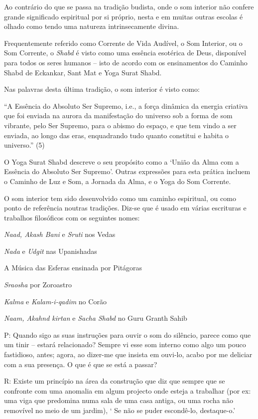 Ao contrário do que se passa na tradição budista, onde o som interior
não confere grande significado espiritual por si próprio, nesta e em
muitas outras escolas é olhado como tendo uma natureza intrinsecamente
divina.

Frequentemente referido como Corrente de Vida Audível, o Som Interior,
ou o Som Corrente, o \emph{Shabd} é visto como uma essência esotérica de
Deus, disponível para todos os seres humanos -- isto de acordo com os
ensinamentos do Caminho Shabd de Eckankar, Sant Mat e Yoga Surat Shabd.

Nas palavras desta última tradição, o som interior é visto como:

``A Essência do Absoluto Ser Supremo, i.e., a força dinâmica da energia
criativa que foi enviada na aurora da manifestação do universo sob a
forma de som vibrante, pelo Ser Supremo, para o abismo do espaço, e que
tem vindo a ser enviada, ao longo das eras, enquadrando tudo quanto
constitui e habita o universo.'' (5)

O Yoga Surat Shabd descreve o seu propósito como a `União da Alma com a
Essência do Absoluto Ser Supremo'. Outras expressões para esta prática
incluem o Caminho de Luz e Som, a Jornada da Alma, e o Yoga do Som
Corrente.

O som interior tem sido desenvolvido como um caminho espiritual, ou como
ponto de referência noutras tradições. Diz-se que é usado em várias
escrituras e trabalhos filosóficos com os seguintes nomes:

\emph{Naad, Akash Bani} e \emph{Sruti} nos Vedas

\emph{Nada} e \emph{Udgit} nas Upanishadas

A Música das Esferas ensinada por Pitágoras

\emph{Sraosha} por Zoroastro

\emph{Kalma} e \emph{Kalam-i-qadim} no Corão

\emph{Naam, Akahnd kirtan} e \emph{Sacha Shabd} no Guru Granth Sahib

P: Quando sigo as suas instruções para ouvir o som do silêncio, parece
como que um tinir -- estará relacionado? Sempre vi esse som interno como
algo um pouco fastidioso, antes; agora, ao dizer-me que insista em
ouvi-lo, acabo por me deliciar com a sua presença. O que é que se está a
passar?

R: Existe um princípio na área da construção que diz que sempre que se
confronte com uma anomalia em algum projecto onde esteja a trabalhar
(por ex: uma viga que predomina numa sala de uma casa antiga, ou uma
rocha não removível no meio de um jardim), ` Se não se puder escondê-lo,
destaque-o.'

